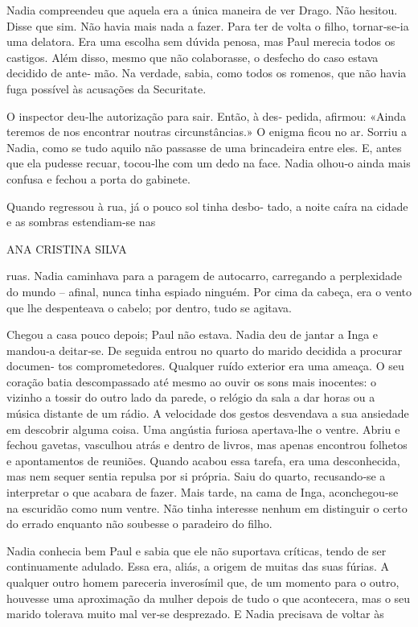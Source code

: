 Nadia compreendeu que aquela era a única maneira de ver Drago. Não
hesitou. Disse que sim. Não havia mais nada a fazer. Para ter de volta o
filho, tornar‑se‑ia uma delatora. Era uma escolha sem dúvida penosa, mas
Paul merecia todos os castigos. Além disso, mesmo que não colaborasse, o
desfecho do caso estava decidido de ante‑ mão. Na verdade, sabia, como
todos os romenos, que não havia fuga possível às acusações da
Securitate.

O inspector deu‑lhe autorização para sair. Então, à des‑ pedida,
afirmou: «Ainda teremos de nos encontrar noutras circunstâncias.» O
enigma ficou no ar. Sorriu a Nadia, como se tudo aquilo não passasse de
uma brincadeira entre eles. E, antes que ela pudesse recuar, tocou‑lhe
com um dedo na face. Nadia olhou‑o ainda mais confusa e fechou a porta
do gabinete.

Quando regressou à rua, já o pouco sol tinha desbo‑ tado, a noite caíra
na cidade e as sombras estendiam‑se nas

ANA CRISTINA SILVA

ruas. Nadia caminhava para a paragem de autocarro, carregando a
perplexidade do mundo -- afinal, nunca tinha espiado ninguém. Por cima
da cabeça, era o vento que lhe despenteava o cabelo; por dentro, tudo se
agitava.

Chegou a casa pouco depois; Paul não estava. Nadia deu de jantar a Inga
e mandou‑a deitar‑se. De seguida entrou no quarto do marido decidida a
procurar documen‑ tos comprometedores. Qualquer ruído exterior era uma
ameaça. O seu coração batia descompassado até mesmo ao ouvir os sons
mais inocentes: o vizinho a tossir do outro lado da parede, o relógio da
sala a dar horas ou a música distante de um rádio. A velocidade dos
gestos desvendava a sua ansiedade em descobrir alguma coisa. Uma
angústia furiosa apertava‑lhe o ventre. Abriu e fechou gavetas,
vasculhou atrás e dentro de livros, mas apenas encontrou folhetos e
apontamentos de reuniões. Quando acabou essa tarefa, era uma
desconhecida, mas nem sequer sentia repulsa por si própria. Saiu do
quarto, recusando‑se a interpretar o que acabara de fazer. Mais tarde,
na cama de Inga, aconchegou‑se na escuridão como num ventre. Não tinha
interesse nenhum em distinguir o certo do errado enquanto não soubesse o
paradeiro do filho.

Nadia conhecia bem Paul e sabia que ele não suportava críticas, tendo de
ser continuamente adulado. Essa era, aliás, a origem de muitas das suas
fúrias. A qualquer outro homem pareceria inverosímil que, de um momento
para o outro, houvesse uma aproximação da mulher depois de tudo o que
acontecera, mas o seu marido tolerava muito mal ver‑se desprezado. E
Nadia precisava de voltar às


